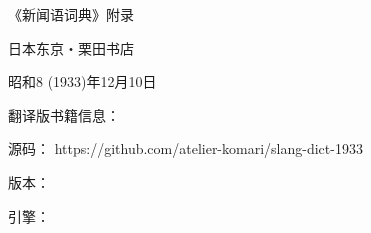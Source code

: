 
\maketitle

《新闻语词典》附录

日本东京・栗田书店

昭和8 (1933)年12月10日

\clearpage


翻译版书籍信息：

源码：
{https://github.com/atelier-komari/slang-dict-1933}

版本：\gitversion

引擎：\engineversion




\clearpage